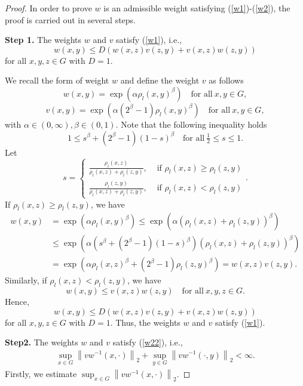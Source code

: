 \documentclass[10pt,a4paper]{amsart}
\begin{document}
	\begin{proof}
		
		In order to prove $w$ is an admissible weight satisfying (\ref{w1})-(\ref{w2}), the proof is carried out in several steps.
		
		\textbf{Step 1.}  The weights $w$ and $v$ satisfy (\ref{w1}), i.e.,
		$$w(x,y)\le D\left ( w(x,z)v(z,y)+ v(x,z)w(z,y)\right)$$ for all $x,y,z\in G$ with $D=1$.
		
		\noindent We recall the form of weight $w$ and define the weight $v$ as follows
		\begin{equation}
			\label{adw1}
			w(x,y)=\exp(\alpha \rho_{l }(x,y)^{\beta})\quad \text{for~all}~ x,y\in G,
		\end{equation}
		\begin{equation}\label{adv1}
			v(x,y)=\exp(\alpha (2^{\beta }-1) \rho_{l}(x,y)^{\beta}) \quad \text{for~all}~ x,y\in G,
		\end{equation}
		with $\alpha\in (0,\infty),\beta \in (0,1)$.
		Note that the following inequality holds
		$$ 1\leq s^\beta +(2^\beta -1)(1-s)^\beta\quad\text{for~all}~\tfrac{1}{2}\leq s \leq 1.$$
		Let 
		$$
		s=\begin{cases}
			\frac{\rho_l(x,z)}{\rho_l(x,z)+\rho_l(z,y)}, &\text{ if } \rho_l(x,z)\geq \rho_l(z,y)\\
			\frac{\rho_l(z,y)}{\rho_l(x,z)+\rho_l(z,y)}, &\text{ if } \rho_l(x,z)< \rho_l(z,y)
		\end{cases}.
		$$
		If $ \rho_l(x,z)\geq \rho_l(z,y)$, we have
		\begin{align*}
			w(x,y)&=\exp(\alpha \rho_{l }(x,y)^{\beta})\le \exp(\alpha( \rho_{l }(x,z)+\rho_{l }(z,y))^{\beta }) \\
			&\leq\exp(\alpha (s^\beta+(2^\beta-1)(1-s)^\beta)( \rho_{l}(x,z)+\rho_{l}(z,y))^{\beta})\\
			&=\exp(\alpha\rho_l(x,z)^\beta +(2^\beta-1)\rho_l(z,y)^\beta)=w(x,z)v(z,y).
		\end{align*}
		Similarly, if $\rho_l(x,z)< \rho_l(z,y)$, we have
		$$w(x,y)\leq v(x,z)w(z,y)\quad\text{for~all}~x,y,z\in G.$$
		Hence,
		$$w(x,y)\leq D\left(w(x,z)v(z,y)+v(x,z)w(z,y)\right)$$
		for all $x,y,z\in G$ with $D=1$.
		Thus, the weights $w$ and $v$ satisfy (\ref{w1}).
		
		\textbf{Step2.} The weights $w$ and $v$ satisfy (\ref{w22}), i.e.,
		\begin{align*}
			\sup_{x\in G}\left \| vw^{-1}(x,\cdot ) \right \| _{2}+\sup_{y\in G}\left \| vw^{-1}(\cdot,y ) \right \| _{2}<\infty.
		\end{align*}
		Firstly, we estimate $\sup_{x\in G}\left \| vw^{-1}(x,\cdot ) \right \| _{2}$.
		

\end{proof}
\end{document}
